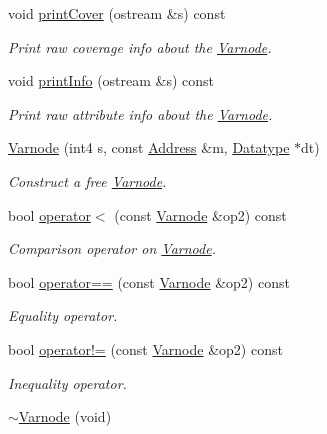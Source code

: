 \begin{DoxyCompactItemize}
void \mbox{\hyperlink{class_varnode_a0668e171937a1db3155563d0b1fd9324}{print\+Cover}} (ostream \&s) const
\begin{DoxyCompactList}\small\item\em Print raw coverage info about the \mbox{\hyperlink{class_varnode}{Varnode}}. \end{DoxyCompactList}\item 
void \mbox{\hyperlink{class_varnode_ac23b9dc5c3f9e94389d454184f11cff8}{print\+Info}} (ostream \&s) const
\begin{DoxyCompactList}\small\item\em Print raw attribute info about the \mbox{\hyperlink{class_varnode}{Varnode}}. \end{DoxyCompactList}\item 
\mbox{\hyperlink{class_varnode_ab532ee1bda485d4292dd48f7313986fa}{Varnode}} (int4 s, const \mbox{\hyperlink{class_address}{Address}} \&m, \mbox{\hyperlink{class_datatype}{Datatype}} $\ast$dt)
\begin{DoxyCompactList}\small\item\em Construct a {\itshape free} \mbox{\hyperlink{class_varnode}{Varnode}}. \end{DoxyCompactList}\item 
bool \mbox{\hyperlink{class_varnode_a3a2b6667e362e55c82ab0c983693ad92}{operator$<$}} (const \mbox{\hyperlink{class_varnode}{Varnode}} \&op2) const
\begin{DoxyCompactList}\small\item\em Comparison operator on \mbox{\hyperlink{class_varnode}{Varnode}}. \end{DoxyCompactList}\item 
bool \mbox{\hyperlink{class_varnode_afab4c9a244385f9c849ead46102b69d8}{operator==}} (const \mbox{\hyperlink{class_varnode}{Varnode}} \&op2) const
\begin{DoxyCompactList}\small\item\em Equality operator. \end{DoxyCompactList}\item 
bool \mbox{\hyperlink{class_varnode_a77f70431d1dd91c528a8a6fa445ce0f9}{operator!=}} (const \mbox{\hyperlink{class_varnode}{Varnode}} \&op2) const
\begin{DoxyCompactList}\small\item\em Inequality operator. \end{DoxyCompactList}\item 
\mbox{\hyperlink{class_varnode_a923a208c2607e493576deac0765ef058}{$\sim$\+Varnode}} (void)

\end{DoxyCompactItemize}
